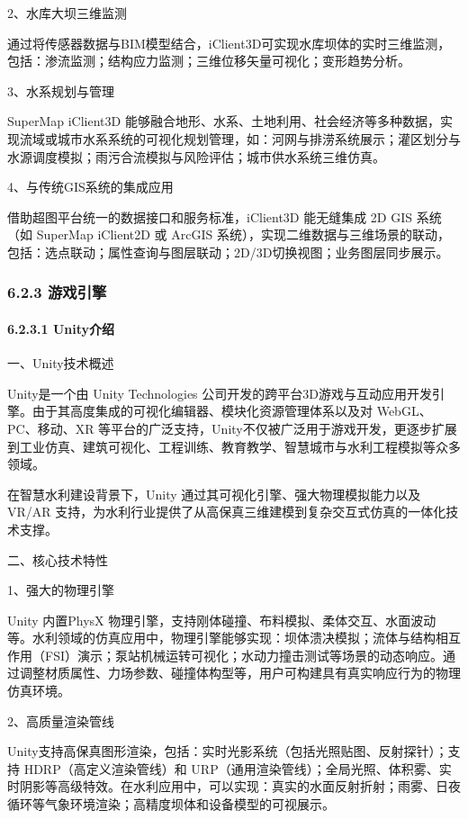 2、水库大坝三维监测

通过将传感器数据与BIM模型结合，iClient3D可实现水库坝体的实时三维监测，包括：渗流监测；结构应力监测；三维位移矢量可视化；变形趋势分析。

3、水系规划与管理

SuperMap iClient3D 能够融合地形、水系、土地利用、社会经济等多种数据，实现流域或城市水系系统的可视化规划管理，如：河网与排涝系统展示；灌区划分与水源调度模拟；雨污合流模拟与风险评估；城市供水系统三维仿真。

4、与传统GIS系统的集成应用

借助超图平台统一的数据接口和服务标准，iClient3D 能无缝集成 2D GIS 系统（如 SuperMap iClient2D 或 ArcGIS 系统），实现二维数据与三维场景的联动，包括：选点联动；属性查询与图层联动；2D/3D切换视图；业务图层同步展示。

\hypertarget{ux6e38ux620fux5f15ux64ce}{%
\subsubsection{6.2.3 游戏引擎}\label{ux6e38ux620fux5f15ux64ce}}

\hypertarget{unityux4ecbux7ecd}{%
\paragraph{6.2.3.1 Unity介绍}\label{unityux4ecbux7ecd}}

一、Unity技术概述

Unity是一个由 Unity Technologies 公司开发的跨平台3D游戏与互动应用开发引擎。由于其高度集成的可视化编辑器、模块化资源管理体系以及对 WebGL、PC、移动、XR 等平台的广泛支持，Unity不仅被广泛用于游戏开发，更逐步扩展到工业仿真、建筑可视化、工程训练、教育教学、智慧城市与水利工程模拟等众多领域。

在智慧水利建设背景下，Unity 通过其可视化引擎、强大物理模拟能力以及 VR/AR 支持，为水利行业提供了从高保真三维建模到复杂交互式仿真的一体化技术支撑。

二、核心技术特性

1、强大的物理引擎

Unity 内置PhysX 物理引擎，支持刚体碰撞、布料模拟、柔体交互、水面波动等。水利领域的仿真应用中，物理引擎能够实现：坝体溃决模拟；流体与结构相互作用（FSI）演示；泵站机械运转可视化；水动力撞击测试等场景的动态响应。通过调整材质属性、力场参数、碰撞体构型等，用户可构建具有真实响应行为的物理仿真环境。

2、高质量渲染管线

Unity支持高保真图形渲染，包括：实时光影系统（包括光照贴图、反射探针）；支持 HDRP（高定义渲染管线）和 URP（通用渲染管线）；全局光照、体积雾、实时阴影等高级特效。在水利应用中，可以实现：真实的水面反射折射；雨雾、日夜循环等气象环境渲染；高精度坝体和设备模型的可视展示。

